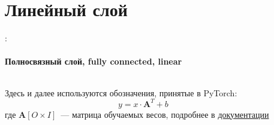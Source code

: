 \documentclass{beamer}
\newcommand{\mtx}[1]{\boldsymbol{#1}}
\begin{document}
\section{Линейный слой}

\begin{frame}{\secname : \subsecname}
  \framesubtitle{Полносвязный слой, fully connected, linear}
  \begin{columns}

    \begin{column}{0.5\textwidth}
      Здесь и далее используются обозначения, принятые в PyTorch:
      $$
      y = x \cdot \mtx{A}^T + b
      $$
      где $\mtx{A}[O \times I]$~--- матрица обучаемых весов,
      подробнее в
      \href{https://docs.pytorch.org/docs/stable/generated/torch.nn.Linear.html}{документации}

    \end{column}

    \begin{column}{0.5\textwidth}
      \begin{center}
      \end{center}
    \end{column}

  \end{columns}
\end{frame}
\end{document}
